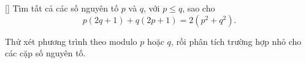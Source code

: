 \documentclass[../04-diophantine-equations.tex]{subfiles}
\begin{document}
\begin{exercise*}\label{example:ROU-2014-MO-G7-P1}[\textbf{}]
    Tìm tất cả các số nguyên tố \( p \) và \( q \), với \( p \le q \), sao cho
    \[
        p(2q + 1) + q(2p + 1) = 2(p^2 + q^2).
    \]
\end{exercise*}

\begin{remark*}
    Thử xét phương trình theo modulo \(p\) hoặc \(q\), rồi phân tích trường hợp nhỏ cho các cặp số nguyên tố.
\end{remark*}




\end{document}
